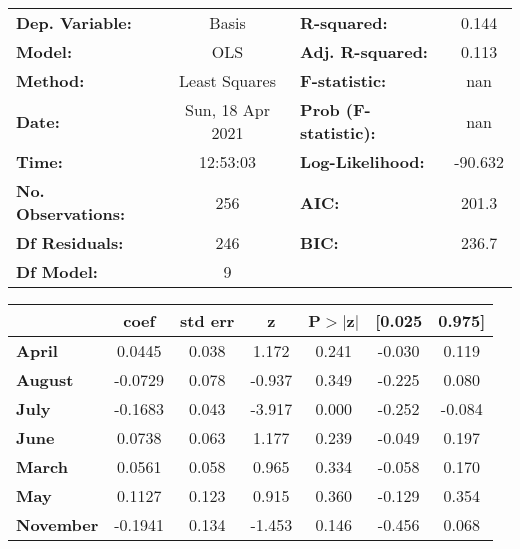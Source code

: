 \begin{center}
\begin{tabular}{lclc}
\toprule
\textbf{Dep. Variable:}    &      Basis       & \textbf{  R-squared:         } &     0.144   \\
\textbf{Model:}            &       OLS        & \textbf{  Adj. R-squared:    } &     0.113   \\
\textbf{Method:}           &  Least Squares   & \textbf{  F-statistic:       } &       nan   \\
\textbf{Date:}             & Sun, 18 Apr 2021 & \textbf{  Prob (F-statistic):} &      nan    \\
\textbf{Time:}             &     12:53:03     & \textbf{  Log-Likelihood:    } &   -90.632   \\
\textbf{No. Observations:} &         256      & \textbf{  AIC:               } &     201.3   \\
\textbf{Df Residuals:}     &         246      & \textbf{  BIC:               } &     236.7   \\
\textbf{Df Model:}         &           9      & \textbf{                     } &             \\
\bottomrule
\end{tabular}
\begin{tabular}{lcccccc}
                   & \textbf{coef} & \textbf{std err} & \textbf{z} & \textbf{P$> |$z$|$} & \textbf{[0.025} & \textbf{0.975]}  \\
\midrule
\textbf{April}     &       0.0445  &        0.038     &     1.172  &         0.241        &       -0.030    &        0.119     \\
\textbf{August}    &      -0.0729  &        0.078     &    -0.937  &         0.349        &       -0.225    &        0.080     \\
\textbf{July}      &      -0.1683  &        0.043     &    -3.917  &         0.000        &       -0.252    &       -0.084     \\
\textbf{June}      &       0.0738  &        0.063     &     1.177  &         0.239        &       -0.049    &        0.197     \\
\textbf{March}     &       0.0561  &        0.058     &     0.965  &         0.334        &       -0.058    &        0.170     \\
\textbf{May}       &       0.1127  &        0.123     &     0.915  &         0.360        &       -0.129    &        0.354     \\
\textbf{November}  &      -0.1941  &        0.134     &    -1.453  &         0.146        &       -0.456    &        0.068     \\

\end{tabular}
\end{center}
